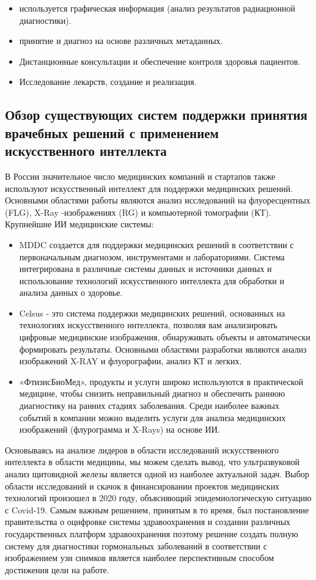 \begin{itemize}
    \item используется графическая информация (анализ результатов радиационной диагностики).
    \item принятие и диагноз на основе различных метаданных.
    \item Дистанционные консультации и обеспечение контроля здоровья пациентов.
    \item Исследование лекарств, создание и реализация.
\end{itemize}

\subsection{Обзор существующих систем поддержки принятия врачебных решений с применением искусственного интеллекта}
В России значительное число медицинских компаний и стартапов также используют искусственный интеллект для поддержки медицинских решений. Основными областями работы являются анализ исследований на флуоресцентных (FLG), X-Ray -изображениях (RG) и компьютерной томографии (КТ).\\
Крупнейшие ИИ медицинские системы:\\
\begin{itemize}
    \item MDDC создается для поддержки медицинских решений в соответствии с первоначальным диагнозом, инструментами и лабораториями. Система интегрирована в различные системы данных и источники данных и использование технологий искусственного интеллекта для обработки и анализа данных о здоровье.
    \item Celsus - это система поддержки медицинских решений, основанных на технологиях искусственного интеллекта, позволяя вам анализировать цифровые медицинские изображения, обнаруживать объекты и автоматически формировать результаты. Основными областями разработки являются анализ изображений X-RAY и флуорографии, анализ КТ и легких.
    \item «ФтизисБиоМед», продукты и услуги широко используются в практической медицине, чтобы снизить неправильный диагноз и обеспечить раннюю диагностику на ранних стадиях заболевания. Среди наиболее важных событий в компании можно выделить услуги для анализа медицинских изображений (флурограмма и X-Rays) на основе ИИ.
\end{itemize}
Основываясь на анализе лидеров в области исследований искусственного интеллекта в области медицины, мы можем сделать вывод, что ультразвуковой анализ щитовидной железы является одной из наиболее актуальной задач. Выбор области исследований и скачок в финансировании проектов медицинских технологий произошел в 2020 году, объясняющий эпидемиологическую ситуацию с Covid-19. Самым важным решением, принятым в то время, был постановление правительства о оцифровке системы здравоохранения и создании различных государственных платформ здравоохранения поэтому решение создать полную систему для диагностики гормональных заболеваний в соответствии с изображением узи снимков является наиболее перспективным способом достижения цели на работе.\\
